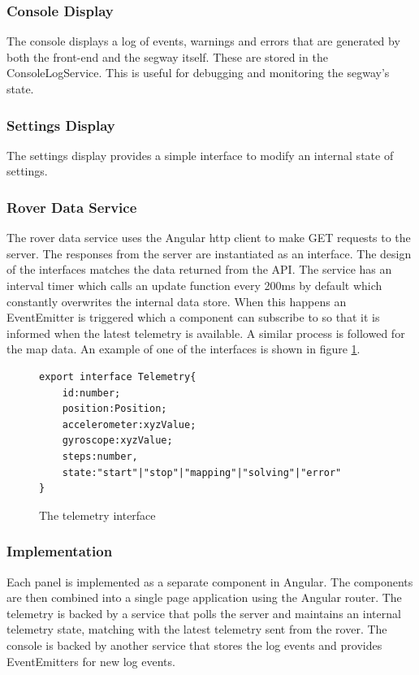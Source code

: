 \subsubsection*{Console Display}
The console displays a log of events, warnings and errors that are generated by both the front-end and the segway itself. These are stored in the ConsoleLogService. This is useful for debugging and monitoring the segway's state.

\subsubsection*{Settings Display}
The settings display provides a simple interface to modify an internal state of settings.

\subsubsection*{Rover Data Service}
The rover data service uses the Angular http client to make GET requests to the server. The responses from the server are instantiated as an interface. The design of the interfaces matches the data returned from the API. The service has an interval timer which calls an update function every 200ms by default which constantly overwrites the internal data store. When this happens an EventEmitter is triggered which a component can subscribe to so that it is informed when the latest telemetry is available. A similar process is followed for the map data.
An example of one of the interfaces is shown in figure \ref{code:telemetry_interface}.

\begin{figure}
    \begin{verbatim}
export interface Telemetry{
    id:number;
    position:Position;
    accelerometer:xyzValue;
    gyroscope:xyzValue;
    steps:number,
    state:"start"|"stop"|"mapping"|"solving"|"error"
}
    \end{verbatim}
    \caption{The telemetry interface}
    \label{code:telemetry_interface}
\end{figure}

\subsubsection*{Implementation}
Each panel is implemented as a separate component in Angular. The components are then combined into a single page application using the Angular router.
The telemetry is backed by a service that polls the server and maintains an internal telemetry state, matching with the latest telemetry sent from the rover.
The console is backed by another service that stores the log events and provides EventEmitters for new log events.

